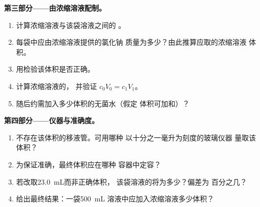 \begin{problem}
\medskip
\noindent\textbf{第三部分——由浓缩溶液配制。}
\begin{enumerate}[resume]
  \item 计算浓缩溶液与该袋溶液之间的
        。
  \item 每袋中应由浓缩溶液提供的氯化钠
        质量为多少？由此推算应取的浓缩溶液
        体积。
  \item 用检验该体积是否正确。
  \item 计算浓缩溶液的，
        并验证 $c_0 V_0 = c_1 V_1$。
  \item 随后约需加入多少体积的无菌水（假定
        体积可加和）？
\end{enumerate}

\medskip
\noindent\textbf{第四部分——仪器与准确度。}
\begin{enumerate}[resume]
  \item 不存在该体积的移液管。可用哪种
        以十分之一毫升为刻度的玻璃仪器
        量取该体积？
  \item 为保证准确，最终体积应在哪种
        容器中定容？
  \item 若改取\qty{23.0}{mL}而非正确体积，
        该袋溶液的将为多少？偏差为
        百分之几？
  \item 给出最终结果：一袋\qty{500}{mL}
        溶液中应加入浓缩溶液多少体积？
\end{enumerate}
\end{problem}
